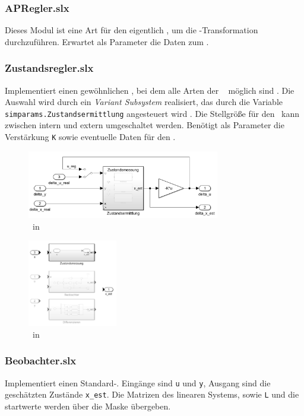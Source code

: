 \subsubsection{APRegler.slx}
Dieses Modul ist eine Art  für den eigentlich \zsr, um die \ap-Transformation durchzuführen.
Erwartet als Parameter die Daten zum \ap.

\subsubsection{Zustandsregler.slx}
Implementiert einen gewöhnlichen \zsr, bei dem alle Arten der \ze\  möglich sind .
Die Auswahl wird durch ein \emph{Variant Subsystem} realisiert, das durch die Variable \texttt{simparams.Zustandsermittlung} angesteuert wird .
Die Stellgröße für den \beob\ kann zwischen intern und extern umgeschaltet werden.
Benötigt als Parameter die Verstärkung \texttt{K} sowie eventuelle Daten für den \beob.

\begin{figure}[htb]
	\centering
		\includegraphics[width=0.75\textwidth]{Bilder/Simulink/zsr.PNG}
	\caption{\zsr\ in \sm}
	\label{fig:simzsr}
\end{figure}

\begin{figure}[htb]
	\centering
		\includegraphics[width=0.35\textwidth]{Bilder/Simulink/zustandsermittlung.PNG}
	\caption{\ze\ in \sm}
	\label{fig:simzse}
\end{figure}

\subsubsection{Beobachter.slx}
Implementiert einen Standard-\beob. 
Eingänge sind \texttt{u} und \texttt{y}, Ausgang sind die geschätzten Zustände \texttt{x\_est}.
Die Matrizen des linearen Systems, sowie \texttt{L} und die \beob startwerte werden über die Maske übergeben.

